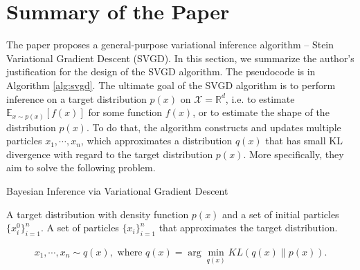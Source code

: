 \section{Summary of the Paper}

The paper proposes a general-purpose variational inference algorithm -- Stein Variational Gradient Descent (SVGD). In this section, we summarize the author's justification for the design of the SVGD algorithm. The pseudocode is in Algorithm \ref{alg:svgd}. The ultimate goal of the SVGD algorithm is to perform inference on a target distribution $p(x)$ on $\mathcal{X}=\mathbb{R}^d$, i.e. to estimate $\mathbb{E}_{x\sim p(x)}[f(x)]$ for some function $f(x)$, or to estimate the shape of the distribution $p(x)$. To do that, the algorithm constructs and updates multiple particles $x_1, \cdots, x_n$, which approximates a distribution $q(x)$ that has small KL divergence with regard to the target distribution $p(x)$. More specifically, they aim to solve the following problem.



\begin{algorithm}[t!]
	\caption{Bayesian Inference via Variational Gradient Descent~\cite{ref_article_svgd}}
	\label{alg:svgd}
	\begin{algorithmic}
		 A target distribution with density function $p(x)$ and a set of initial particles $\{x_i^0\}_{i=1}^n$.
		 A set of particles $\{x_i\}_{i=1}^n$ that approximates the target distribution.
		\ENDFOR
	\end{algorithmic}
\end{algorithm}

\begin{align}
    x_1,\cdots,x_n\sim q(x), \text{ where }q(x) = \arg\min_{q(x)} KL(q(x)\lVert p(x)).
\end{align}

